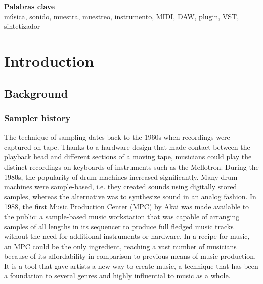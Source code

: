 \documentclass[12pt, a4paper, hidelinks]{article}
\begin{document}
	
	\vspace*{\fill}
	\large
	\textbf{Palabras clave}\\
	
	\vspace{-1em}
	\normalsize	
	\noindent música, sonido, muestra, muestreo, instrumento, MIDI, DAW, plugin, VST, sintetizador
	
	
	
	\newpage
	\tableofcontents


	\newpage
	\section{Introduction}
	\subsection{Background}
	\subsubsection{Sampler history}
	The technique of sampling dates back to the 1960s when recordings were captured on tape. Thanks to a hardware design that made contact between the playback head and different sections of a moving tape, musicians could play the distinct recordings on keyboards of instruments such as the Mellotron. During the 1980s, the popularity of drum machines increased significantly. Many drum machines were sample-based, i.e. they created sounds using digitally stored samples, whereas the alternative was to synthesize sound in an analog fashion. In 1988, the first Music Production Center (MPC) by Akai was made available to the public: a sample-based music workstation that was capable of arranging samples of all lengths in its sequencer to produce full fledged music tracks without the need for additional instruments or hardware. In a recipe for music, an MPC could be the only ingredient, reaching a vast number of musicians because of its affordability in comparison to previous means of music production. It is a tool that gave artists a new way to create music, a technique that has been a foundation to several genres and highly influential to music as a whole.\par
	
\end{document}
